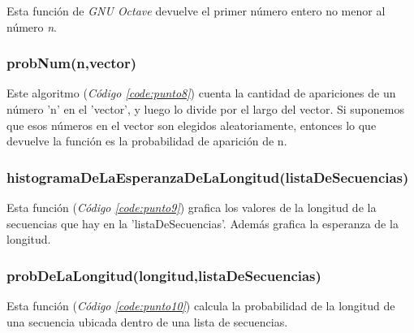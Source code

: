 \documentclass{article}
\newcommand{\refcode}[1]{\textit{Código \ref{#1}}}
\begin{document}
Esta función de \textit{GNU Octave} devuelve el primer número entero no menor al número \textit{n}.


\subsubsection{probNum(n,vector)}

Este algoritmo (\refcode{code:punto8}) cuenta la cantidad de apariciones de un número 'n' en el 'vector', y luego lo divide por el largo del vector. Si suponemos que esos números en el vector son elegidos aleatoriamente, entonces lo que devuelve la función es la probabilidad de aparición de n.




\subsubsection{histogramaDeLaEsperanzaDeLaLongitud(listaDeSecuencias)}

Esta función (\refcode{code:punto9}) grafica los valores de la longitud de la secuencias que hay en la 'listaDeSecuencias'. Además grafica la esperanza de la longitud.




\subsubsection{probDeLaLongitud(longitud,listaDeSecuencias)}

Esta función (\refcode{code:punto10}) calcula la probabilidad de la longitud de una secuencia ubicada dentro de una lista de secuencias.


\bigskip
\end{document}
